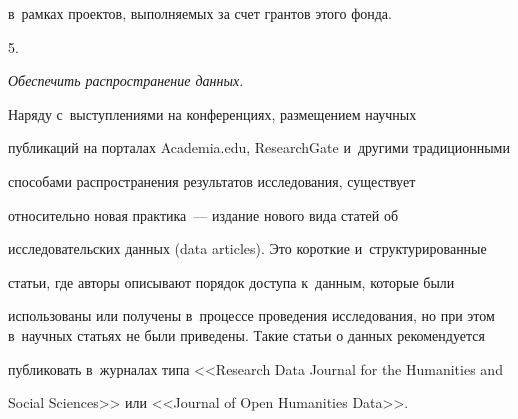 в~рамках проектов, выполняемых за счет грантов этого фонда.

  

  5.

\textit{Обеспечить распространение данных}.



  Наряду с~выступлениями на конференциях, размещением научных 

публикаций на порталах Academia.edu, ResearchGate и~другими традиционными 

способами распространения результатов исследования, существует 

относительно новая практика~--- издание нового вида статей об 

исследовательских данных (data articles). Это короткие и~структурированные 

статьи, где авторы описывают порядок доступа к~данным, которые были 

использованы или получены в~процессе проведения исследования, но при этом в~научных статьях не были приведены. Такие статьи о данных рекомендуется 

публиковать в~журналах типа <<Research Data Journal for the Humanities and 

Social Sciences>> или <<Journal of Open Humanities Data>>.

  

  

